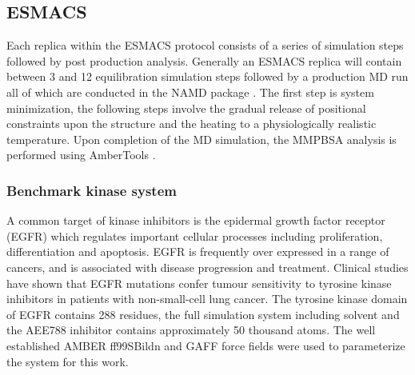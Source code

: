 \subsection{ESMACS}

Each replica within the ESMACS protocol consists of a series of simulation steps followed by post production analysis.
Generally an ESMACS replica will contain between 3 and 12 equilibration simulation steps followed by a production MD run all of which are conducted in the NAMD package \cite{Phillips2005}.
The first step is system minimization, the following steps involve the gradual release of positional constraints upon the structure and the heating to a physiologically realistic temperature.
Upon completion of the MD simulation, the MMPBSA analysis is performed using AmberTools \cite{amber14, Case2005, MillerIII2012}.

\subsubsection{Benchmark kinase system}

A common target of kinase inhibitors is the epidermal growth factor receptor (EGFR) which regulates important cellular processes including proliferation, differentiation and apoptosis.
EGFR is frequently over expressed in a range of cancers, and is associated with disease progression and treatment. 
Clinical studies have shown that EGFR mutations confer tumour sensitivity to tyrosine kinase inhibitors in patients with non-small-cell lung cancer.
The tyrosine kinase domain of EGFR contains 288 residues, the full simulation system including solvent and the AEE788 inhibitor contains approximately 50 thousand atoms.
The well established AMBER ff99SBildn and GAFF force fields \cite{Maier2015, Wang2004} were used to parameterize the system for this work.
